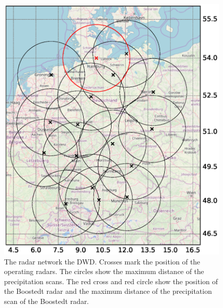 \documentclass[11pt,twoside,a4paper,fleqn,x11names]{report}
\numberwithin{equation}{chapter}
\numberwithin{figure}{chapter}
\numberwithin{table}{chapter}
\begin{document}
\begin{figure}[!htbp]
	\centering
	\includegraphics[width=\textwidth,trim={70mm 0 70mm 10mm}, clip]{dwdradars.eps}
	\caption[DWD radar network]{The radar network the DWD. Crosses mark the position of the operating radars. The circles show the maximum distance of the precipitation scans. The red cross and red circle show the position of the Boostedt radar and the maximum distance of the precipitation scan of the Boostedt radar.}
	\label{fig:radarnetwork}
\end{figure}


\FloatBarrier
\end{document}
